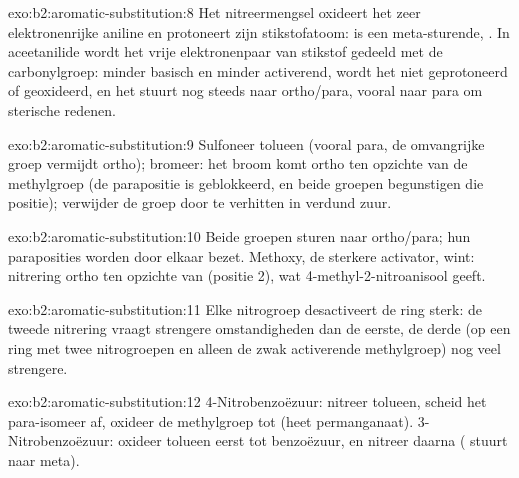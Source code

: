 \begin{solution}{exo:b2:aromatic-substitution:8}
Het nitreermengsel oxideert het zeer elektronenrijke aniline en protoneert zijn stikstofatoom:
 is een meta-sturende, . In aceetanilide wordt het vrije elektronenpaar van stikstof
gedeeld met de carbonylgroep: minder basisch en minder activerend, wordt het niet geprotoneerd of geoxideerd,
en het stuurt nog steeds naar ortho/para, vooral naar para om sterische redenen.
\end{solution}

\begin{solution}{exo:b2:aromatic-substitution:9}
Sulfoneer tolueen (vooral para, de omvangrijke groep vermijdt ortho); bromeer: het broom komt
ortho ten opzichte van de methylgroep (de parapositie is geblokkeerd, en beide groepen begunstigen die positie);
verwijder de groep  door te verhitten in verdund zuur.
\end{solution}

\begin{solution}{exo:b2:aromatic-substitution:10}
Beide groepen sturen naar ortho/para; hun paraposities worden door elkaar bezet. Methoxy, de
sterkere activator, wint: nitrering ortho ten opzichte van  (positie 2), wat
4-methyl-2-nitroanisool geeft.
\end{solution}

\begin{solution}{exo:b2:aromatic-substitution:11}
Elke nitrogroep desactiveert de ring sterk: de tweede nitrering vraagt strengere omstandigheden
dan de eerste, de derde (op een ring met twee nitrogroepen en alleen de zwak activerende
methylgroep) nog veel strengere.
\end{solution}

\begin{solution}{exo:b2:aromatic-substitution:12}
4-Nitrobenzoëzuur: nitreer tolueen, scheid het para-isomeer af, oxideer de methylgroep tot
 (heet permanganaat). 3-Nitrobenzoëzuur: oxideer tolueen eerst tot benzoëzuur, en
nitreer daarna ( stuurt naar meta).
\end{solution}

